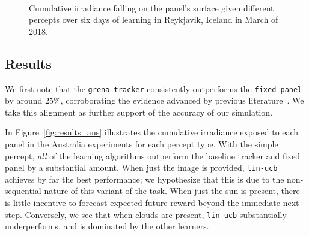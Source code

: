 \documentclass{article}
\begin{document}
{\begin{figure}
\begin{center}
	 \\ %
\caption{Cumulative irradiance falling on the panel's surface given different percepts over six days of learning in Reykjavik, Iceland in March of 2018.}
\label{fig:results_ice}
\end{center}
\end{figure}


\subsection{Results}


We first note that the \texttt{grena-tracker} consistently outperforms the \texttt{fixed-panel} by around $25\%$, corroborating the evidence advanced by previous literature~\cite{Eke2012,mousazadeh2009review,clifford2004design}. We take this alignment as further support of the accuracy of our simulation.

In Figure~\ref{fig:results_aus} illustrates the cumulative irradiance exposed to each panel in the Australia experiments for each percept type. With the simple percept, {\it all} of the learning algorithms outperform the baseline tracker and fixed panel by a substantial amount. When just the image is provided, \texttt{lin-ucb} achieves by far the best performance; we hypothesize that this is due to the non-sequential nature of this variant of the task. When just the sun is present, there is little incentive to forecast expected future reward beyond the immediate next step. Conversely, we see that when clouds are present, \texttt{lin-ucb} substantially underperforms, and is dominated by the other learners.

}
\end{document}
